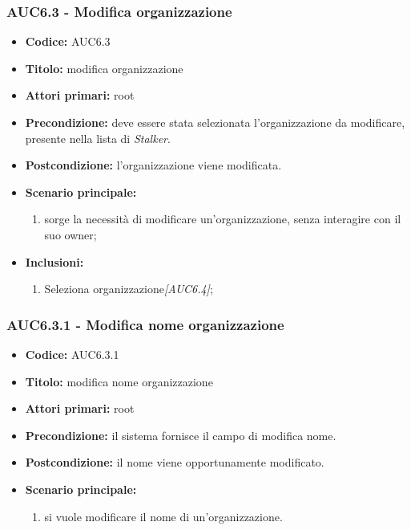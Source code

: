 \documentclass[casi-duso]{subfiles}
\begin{document}
\subsubsection{AUC6.3 - Modifica organizzazione}%
\label{subsub:AUC6.3}
\begin{itemize}
  \item \textbf{Codice:} AUC6.3
  \item \textbf{Titolo:} modifica organizzazione
  \item \textbf{Attori primari:} root
  \item \textbf{Precondizione:} deve essere stata selezionata l'organizzazione da modificare, presente nella lista di \emph{Stalker}.
  \item \textbf{Postcondizione:} l'organizzazione viene modificata.
  \item \textbf{Scenario principale:}
  \begin{enumerate}
    \item sorge la necessità di modificare un'organizzazione, senza interagire con il suo owner;
  \end{enumerate}
  \item \textbf{Inclusioni:}
  \begin{enumerate}
    \item Seleziona organizzazione\emph{[AUC6.4]};
  \end{enumerate}
\end{itemize}

\subsubsection{AUC6.3.1 - Modifica nome organizzazione}%
\label{subsub:AUC6.3.1}
\begin{itemize}
  \item \textbf{Codice:} AUC6.3.1
  \item \textbf{Titolo:} modifica nome organizzazione
  \item \textbf{Attori primari:} root
  \item \textbf{Precondizione:} il sistema fornisce il campo di modifica nome.
  \item \textbf{Postcondizione:} il nome viene opportunamente modificato.
  \item \textbf{Scenario principale:}
  \begin{enumerate}
    \item si vuole modificare il nome di un'organizzazione.
  \end{enumerate}

\end{itemize}
\end{document}
